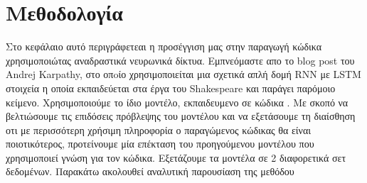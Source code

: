 \chapter{Μεθοδολογία}
Στο κεφάλαιο αυτό περιγράφετεαι η προσέγγιση μας στην παραγωγή κώδικα χρησιμοποιώτας αναδραστικά νευρωνικά δίκτυα. Εμπνεόμαστε απο το blog post του Andrej Karpathy, στο οπoίο χρησιμοποιείται μια σχετικά απλή δομή RNN με LSTM στοιχεία η οποία εκπαιδεύεται στα έργα του Shakespeare και παράγει παρόμοιο κείμενο. Χρησιμοποιούμε το ίδιο μοντέλο, εκπαιδευμενο σε κώδικα .  Με σκοπό να βελτιώσουμε τις επιδόσεις πρόβλεψης του μοντέλου και να εξετάσουμε τη διαίσθηση οτι με περισσότερη χρήσιμη πληροφορία ο παραγώμενος κώδικας θα είναι ποιοτικότερος, προτείνουμε μία επέκταση του προηγούμενου μοντέλου που χρησιμοποιεί  γνώση για τον κώδικα. Εξετάζουμε τα μοντέλα σε 2 διαφορετικά σετ δεδομένων. Παρακάτω ακολουθεί αναλυτική παρουσίαση της μεθόδου  
